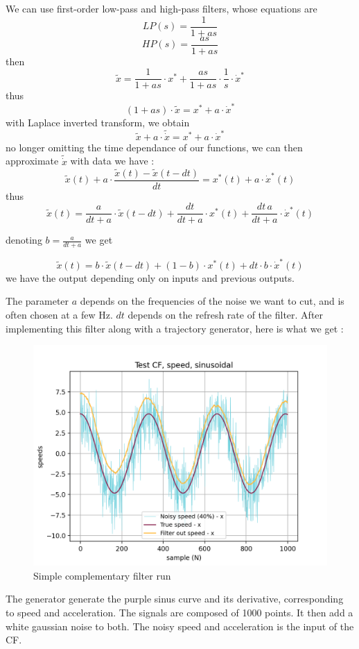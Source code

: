 \documentclass[a4paper,10pt]{article}
\begin{document}
We can use first-order low-pass and high-pass filters, whose equations are
$$LP(s) = \frac{1}{1+as}$$
$$HP(s) = \frac{as}{1+as}$$
then
$$\widetilde{x} = \frac{1}{1+as} \cdot x^* + \frac{as}{1+as} \cdot \frac{1}{s} \cdot \dot x^* $$
thus
$$ (1+as) \cdot \tilde{x} = x^* + a\cdot \dot x^*$$
with Laplace inverted transform, we obtain
$$\widetilde{x} + a\cdot \tilde{\dot x} = x^* + a\cdot \dot x^*$$
no longer omitting the time dependance of our functions, we can then approximate $\tilde{\dot x}$ with data we have :
$$\widetilde{x}(t) + a\cdot\frac{\widetilde{x}(t) - \widetilde{x}(t-dt)}{dt} = x^*(t) + a\cdot \dot x^*(t)$$
thus
$$\widetilde{x}(t) = \frac{a}{dt+a}\cdot \widetilde{x}(t-dt) + \frac{dt}{dt+a}\cdot x^*(t) + \frac{dt\, a}{dt+a}\cdot \dot x^*(t) $$

\vspace{4mm}

\noindent denoting $b=\frac{a}{dt+a}$ we get

\vspace{2mm}


$$\widetilde{x}(t) = b\cdot \widetilde{x}(t-dt) + (1-b)\cdot x^*(t) + dt\cdot b\cdot \dot x^*(t) $$
we have the output depending only on inputs and previous outputs.

\bigskip
The parameter $a$ depends on the frequencies of the noise we want to cut, and is often chosen at a few Hz. $dt$ depends on the refresh rate of the filter.
After implementing this filter along with a trajectory generator, here is what we get :

\begin{figure}[H]
\label{fig:complementary_filter_run}
\centering
  \includegraphics[width=\linewidth, angle=0, scale=0.8]{./images/CF_withoutoffset.png}
  \caption{Simple complementary filter run}
\end{figure}
The generator generate the purple sinus curve and its derivative, corresponding to speed and acceleration. The signals are composed of 1000 points. It then add a white gaussian noise to both. The noisy speed and acceleration is the input of the CF.\\
\end{document}

